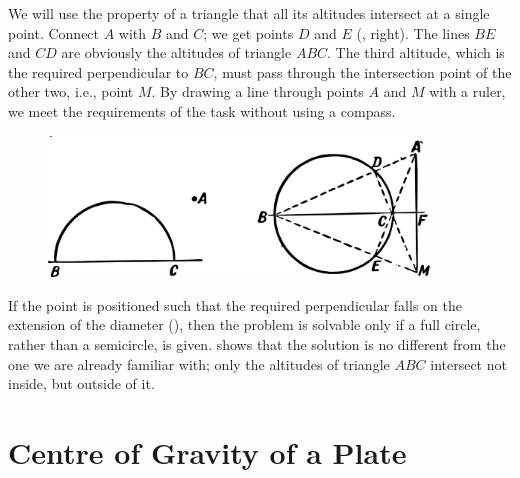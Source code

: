 \ans We will use the property of a triangle that all its altitudes intersect at a single point. Connect $A$ with  $B$ and $C$; we get points $D$ and $E$ (, right). The lines $BE$ and $CD$ are obviously the altitudes of triangle $ABC$. The third altitude, which is the required perpendicular to $BC$, must pass through the intersection point of the other two, i.e., point $M$. By drawing a line through points $A$ and $M$ with a ruler, we meet the requirements of the task without using a compass. 

\begin{figure}[h!]
\centering
\includegraphics[width=0.9\textwidth]{figures/ch-10/fig-142.pdf}
\end{figure}


If the point is positioned such that the required perpendicular falls on the extension of the diameter (), then the problem is solvable only if a full circle, rather than a semicircle, is given.  shows that the solution is no different from the one we are already familiar with; only the altitudes of triangle $ABC$ intersect not inside, but outside of it.


\section{Centre of Gravity of a Plate}
\label{sec-10.2}

